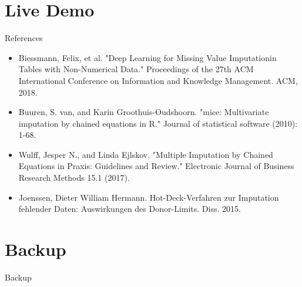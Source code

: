 \documentclass[aspectratio=43]{beamer}
\begin{document}
\section{Live Demo}

\appendix
\begin{frame}{References}
\scriptsize
\begin{itemize}
	\item Biessmann, Felix, et al. "Deep Learning for Missing Value Imputationin Tables with Non-Numerical Data." Proceedings of the 27th ACM International Conference on Information and Knowledge Management. ACM, 2018.
	\item Buuren, S. van, and Karin Groothuis-Oudshoorn. "mice: Multivariate imputation by chained equations in R." Journal of statistical software (2010): 1-68.
	\item Wulff, Jesper N., and Linda Ejlskov. "Multiple Imputation by Chained Equations in Praxis: Guidelines and Review." Electronic Journal of Business Research Methods 15.1 (2017).
	\item Joenssen, Dieter William Hermann. Hot-Deck-Verfahren zur Imputation fehlender Daten: Auswirkungen des Donor-Limits. Diss. 2015.
\end{itemize}
\end{frame}

\section{Backup}

\begin{frame}{Backup}
\end{frame}
\end{document}
